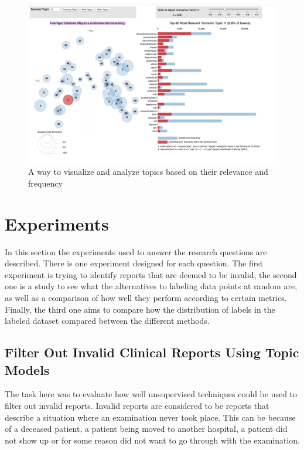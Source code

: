\begin{figure}
    \centering
    \includegraphics[scale=0.3]{figures/ldavis-sample.png}
    \caption{A way to visualize and analyze topics based on their relevance and frequency}
    \label{fig:ldavis-sample}
\end{figure}

\section{Experiments}\label{sec:exp1-method}
In this section the experiments used to answer the research questions are described.
There is one experiment designed for each question.
The first experiment is trying to identify reports that are deemed to be invalid, the second one is a study to see what the alternatives to labeling data points at random are, as well as a comparison of how well they perform according to certain metrics.
Finally, the third one aims to compare how the distribution of labels in the labeled dataset compared between the different methods.

\subsection{Filter Out Invalid Clinical Reports Using Topic Models}

The task here was to evaluate how well unsupervised techniques could be used to filter out invalid reports.
Invalid reports are considered to be reports that describe a situation where an examination never took place.
This can be because of a deceased patient, a patient being moved to another hospital, a patient did not show up or for some reason did not want to go through with the examination.

